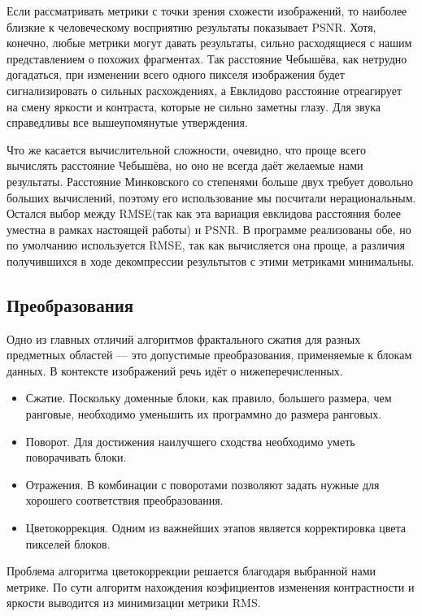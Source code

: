 \documentclass[bachelor,paper]{pmk-graduate}
\theoremstyle{definition}
\begin{document}
Если рассматривать метрики с точки зрения схожести изображений, то наиболее близкие к человеческому восприятию результаты показывает PSNR. Хотя, конечно, любые метрики могут давать результаты, сильно расходящиеся с нашим представлением о похожих фрагментах. Так расстояние Чебышёва, как нетрудно догадаться, при изменении всего одного пикселя изображения будет сигнализировать о сильных расхождениях, а Евклидово расстояние отреагирует на смену яркости и контраста, которые не сильно заметны глазу. Для звука справедливы все вышеупомянутые утверждения.

Что же касается вычислительной сложности, очевидно, что проще всего вычислять расстояние Чебышёва, но оно не всегда даёт желаемые нами результаты. Расстояние Минковского со степенями больше двух требует довольно больших вычислений, поэтому его использование мы посчитали нерациональным. Остался выбор между RMSE(так как эта вариация евклидова расстояния более уместна в рамках настоящей работы) и PSNR. В программе реализованы обе, но по умолчанию используется RMSE, так как вычисляется она проще, а различия получившихся в ходе декомпрессии результытов с этими метриками минимальны.

\subsection{Преобразования}

Одно из главных отличий алгоритмов фрактального сжатия для разных предметных областей --- это допустимые преобразования, применяемые к блокам данных. В контексте изображений речь идёт о нижеперечисленных.
\begin{itemize}
  \item Сжатие. Поскольку доменные блоки, как правило, большего размера, чем ранговые, необходимо уменьшить их программно до размера ранговых.
  \item Поворот. Для достижения наилучшего сходства необходимо уметь поворачивать блоки.
  \item Отражения. В комбинации с поворотами позволяют задать нужные для хорошего соответствия преобразования.
  \item Цветокоррекция. Одним из важнейших этапов является корректировка цвета пикселей блоков.
\end{itemize}

Проблема алгоритма цветокоррекции решается благодаря выбранной нами метрике. По сути алгоритм нахождения коэфициентов изменения контрастности и яркости выводится из минимизации метрики RMS.
\end{document}
